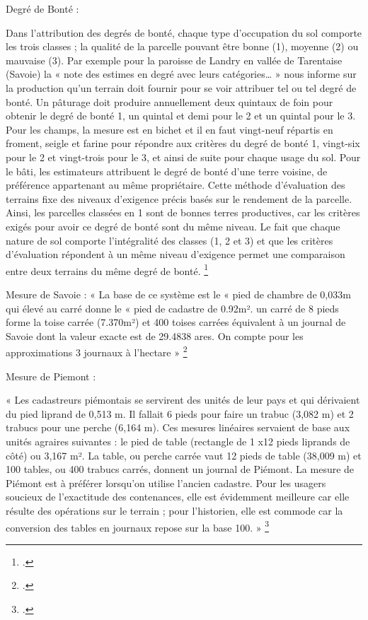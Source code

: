 \documentclass[12pt,a4paper]{report}
\begin{document}
Degré de Bonté :

Dans l’attribution des degrés de bonté, chaque type d’occupation du sol comporte les trois classes ; la qualité de la parcelle pouvant être bonne (1), moyenne (2) ou mauvaise (3). Par exemple pour la paroisse de Landry en vallée de Tarentaise (Savoie) la « note des estimes en degré avec leurs catégories… » nous informe sur la production qu’un terrain doit fournir pour se voir attribuer tel ou tel degré de bonté. Un pâturage doit produire annuellement deux quintaux de foin pour obtenir le degré de bonté 1, un quintal et demi pour le 2 et un quintal pour le 3. Pour les champs, la mesure est en bichet et il en faut vingt-neuf répartis en froment, seigle et farine pour répondre aux critères du degré de bonté 1, vingt-six pour le 2 et vingt-trois pour le 3, et ainsi de suite pour chaque usage du sol. Pour le bâti, les estimateurs attribuent le degré de bonté d’une terre voisine, de préférence appartenant au même propriétaire. Cette méthode d’évaluation des terrains fixe des niveaux d’exigence précis basés sur le rendement de la parcelle. Ainsi, les parcelles classées en 1 sont de bonnes terres productives, car les critères exigés pour avoir ce degré de bonté sont du même niveau. Le fait que chaque nature de sol comporte l’intégralité des classes (1, 2 et 3) et que les critères d’évaluation répondent à un même niveau d’exigence permet une comparaison entre deux terrains du même degré de bonté. \footcite[81--93]{Baud2010} 


Mesure de Savoie :
« La base de ce système est le « pied de chambre de 0,033m qui élevé au carré donne le « pied de cadastre de 0.92m². un carré de 8 pieds forme la toise carrée (7.370m²) et 400 toises carrées équivalent à un journal de Savoie dont la valeur exacte est de 29.4838 ares. On compte pour les approximations 3 journaux à l’hectare » 	\footcite{GUICHONNET1955}


Mesure de Piemont :

« Les cadastreurs piémontais se servirent des unités de leur pays et qui dérivaient du pied liprand de 0,513 m. Il fallait 6 pieds pour faire un trabuc (3,082 m) et 2 trabucs pour une perche (6,164 m). Ces mesures linéaires servaient de base aux unités agraires suivantes : le pied de table (rectangle de 1 x12 pieds liprands de côté) ou 3,167 m². La table, ou perche carrée vaut 12 pieds de table (38,009 m) et 100 tables, ou 400 trabucs carrés, donnent un journal de Piémont. La mesure de Piémont est à préférer lorsqu’on utilise l’ancien cadastre. Pour les usagers soucieux de l’exactitude des contenances, elle est évidemment meilleure car elle résulte des opérations sur le terrain ; pour l’historien, elle est commode car la conversion des tables en journaux repose sur la base 100. » \footcite{GUICHONNET1955}
\end{document}
